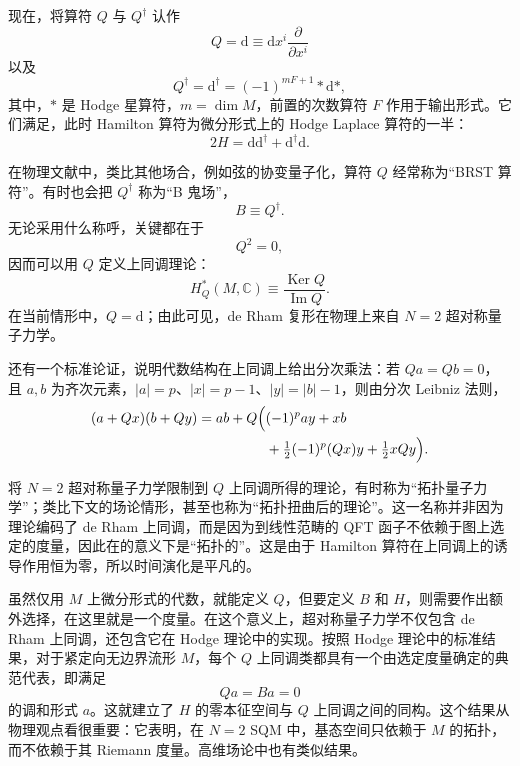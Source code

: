 现在，将算符 $Q$ 与 $Q^\dagger$ 认作
\[
Q=\mathrm{d}\equiv\mathrm{d}x^i\frac{\partial}{\partial x^i}
\]
以及
\[
Q^\dagger=\mathrm{d}^\dagger=(-1)^{mF+1}*\mathrm{d}*,
\]
其中，$*$ 是 Hodge 星算符，$m=\dim M$，前置的次数算符 $F$ 作用于输出形式。它们满足，此时 Hamilton 算符为微分形式上的 Hodge Laplace 算符的一半：
\begin{equation}\label{eq:3.11}
2H=\mathrm{d}\mathrm{d}^\dagger+\mathrm{d}^\dagger\mathrm{d}.
\end{equation}

在物理文献中，类比其他场合，例如弦的协变量子化，算符 $Q$ 经常称为“BRST 算符”。有时也会把 $Q^\dagger$ 称为“B 鬼场”，
\[
B\equiv Q^\dagger.
\]
无论采用什么称呼，关键都在于
\[
Q^2=0,
\]
因而可以用 $Q$ 定义上同调理论：
\[
H_Q^*(M,\mathbb{C})\equiv\frac{\operatorname{Ker}Q}{\operatorname{Im}Q}.
\]
在当前情形中，$Q=\mathrm{d}$；由此可见，de Rham 复形在物理上来自 $N=2$ 超对称量子力学。

还有一个标准论证，说明代数结构在上同调上给出分次乘法：若 $Qa=Qb=0$，且 $a,b$ 为齐次元素，$|a|=p$、$|x|=p-1$、$|y|=|b|-1$，则由分次 Leibniz 法则，
\[
\begin{aligned}
(a+Qx)(b+Qy)=ab+Q\Bigl(&(-1)^p ay+xb\\
&+\tfrac12(-1)^p(Qx)y+\tfrac12xQy\Bigr).
\end{aligned}
\]

将 $N=2$ 超对称量子力学限制到 $Q$ 上同调所得的理论，有时称为“拓扑量子力学”；类比下文的场论情形，甚至也称为“拓扑扭曲后的理论”。这一名称并非因为理论编码了 de Rham 上同调，而是因为到线性范畴的 QFT 函子不依赖于图上选定的度量，因此在的意义下是“拓扑的”。这是由于 Hamilton 算符在上同调上的诱导作用恒为零，所以时间演化是平凡的。

虽然仅用 $M$ 上微分形式的代数，就能定义 $Q$，但要定义 $B$ 和 $H$，则需要作出额外选择，在这里就是一个度量。在这个意义上，超对称量子力学不仅包含 de Rham 上同调，还包含它在 Hodge 理论中的实现。按照 Hodge 理论中的标准结果，对于紧定向无边界流形 $M$，每个 $Q$ 上同调类都具有一个由选定度量确定的典范代表，即满足
\[
Qa=Ba=0
\]
的调和形式 $a$。这就建立了 $H$ 的零本征空间与 $Q$ 上同调之间的同构。这个结果从物理观点看很重要：它表明，在 $N=2$ SQM 中，基态空间只依赖于 $M$ 的拓扑，而不依赖于其 Riemann 度量。高维场论中也有类似结果。

